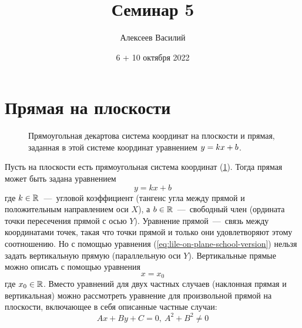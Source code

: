 \documentclass[a4paper,12pt]{article}
\author{Алексеев Василий}
\title{Семинар 5}
\date{6 + 10 октября 2022}
\begin{document}
  \maketitle
  
  \tableofcontents

  \thispagestyle{empty}
  
  \newpage
  


  \section{Прямая на плоскости}
  
  \begin{figure}[h]
    \centering
    
    
    \caption{Прямоугольная декартова система координат на плоскости и прямая, заданная в этой системе координат уравнением $y \hm= kx \hm+ b$.}
    \label{fig:line-on-plane}
  \end{figure}
  
  Пусть на плоскости есть прямоугольная система координат (\ref{fig:line-on-plane}).
  Тогда прямая может быть задана уравнением
  \begin{equation}\label{eq:lile-on-plane-school-version}
    y = kx + b
  \end{equation}
  где $k \hm\in \RR$~---~угловой коэффициент (тангенс угла между прямой и положительным направлением оси $X$),
  а $b \hm\in \RR$~---~свободный член (ордината точки пересечения прямой с осью $Y$).
  Уравнение прямой~---~связь между координатами точек, такая что точки прямой и только они удовлетворяют этому соотношению.
  Но с помощью уравнения (\ref{eq:lile-on-plane-school-version})
  нельзя задать вертикальную прямую (параллельную оси $Y$).
  Вертикальные прямые можно описать с помощью уравнения
  \[
    x = x_0
  \]
  где $x_0 \hm\in \RR$.
  Вместо уравнений для двух частных случаев (наклонная прямая и вертикальная) можно рассмотреть уравнение для произвольной прямой на плоскости, включающее в себя описанные частные случаи:
  \begin{equation}\label{eq:line-in-coord-system}
    Ax + By + C = 0,\ A^2 + B^2 \not= 0
  \end{equation}
  
\end{document}
